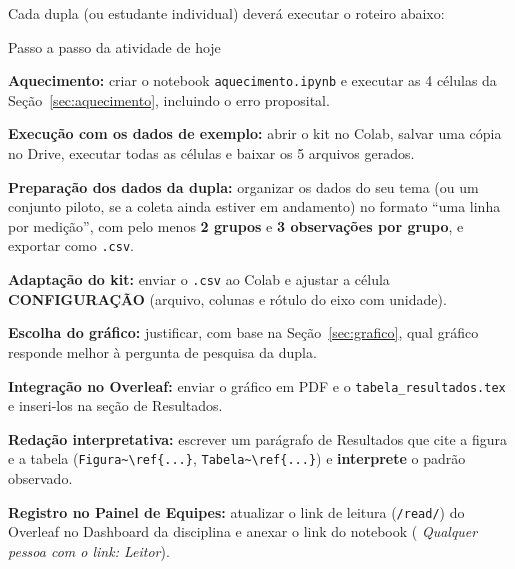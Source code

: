 \documentclass[11pt,a4paper]{article}
\newcommand{\botao}[1]{\tcbox[on line, enhanced, colback=azulMedio!8, colframe=azulMedio!35, boxrule=0.5pt,
    arc=3pt, left=3pt, right=3pt, top=0.5pt, bottom=0.5pt, boxsep=0.5pt]{\sffamily\footnotesize\color{azul}#1}}
\newcommand{\seta}{\,{\color{suave}\scriptsize\faChevronRight}\,}
\newcommand{\circulo}[2][azul]{\tikz[baseline=(c.base)]\node[circle, fill=#1, text=white,
    inner sep=0pt, minimum size=1.35em, font=\footnotesize\bfseries](c){#2};}
\begin{document}
Cada dupla (ou estudante individual) deverá executar o roteiro abaixo:

\begin{painel}{\faTasks}{Passo a passo da atividade de hoje}
\begin{enumerate}[label={\protect\circulo{\arabic*}}, leftmargin=2.4em]
    \item \textbf{Aquecimento:} criar o notebook \texttt{aquecimento.ipynb} e executar as 4 células da Seção~\ref{sec:aquecimento}, incluindo o erro proposital.
    \item \textbf{Execução com os dados de exemplo:} abrir o kit no Colab, salvar uma cópia no Drive, executar todas as células e baixar os 5 arquivos gerados.
    \item \textbf{Preparação dos dados da dupla:} organizar os dados do seu tema (ou um conjunto piloto, se a coleta ainda estiver em andamento) no formato ``uma linha por medição'', com pelo menos \textbf{2 grupos} e \textbf{3 observações por grupo}, e exportar como \texttt{.csv}.
    \item \textbf{Adaptação do kit:} enviar o \texttt{.csv} ao Colab e ajustar a célula \textbf{CONFIGURAÇÃO} (arquivo, colunas e rótulo do eixo com unidade).
    \item \textbf{Escolha do gráfico:} justificar, com base na Seção~\ref{sec:grafico}, qual gráfico responde melhor à pergunta de pesquisa da dupla.
    \item \textbf{Integração no Overleaf:} enviar o gráfico em PDF e o \texttt{tabela\_resultados.tex} e inseri-los na seção de Resultados.
    \item \textbf{Redação interpretativa:} escrever um parágrafo de Resultados que cite a figura e a tabela (\texttt{Figura\textasciitilde\textbackslash ref\{...\}}, \texttt{Tabela\textasciitilde\textbackslash ref\{...\}}) e \textbf{interprete} o padrão observado.
    \item \textbf{Registro no Painel de Equipes:} atualizar o link de leitura (\texttt{/read/}) do Overleaf no Dashboard da disciplina e anexar o link do notebook (\botao{Compartilhar}\seta\textit{Qualquer pessoa com o link: Leitor}).
\end{enumerate}
\end{painel}

\vspace{0.6em}
\end{document}
